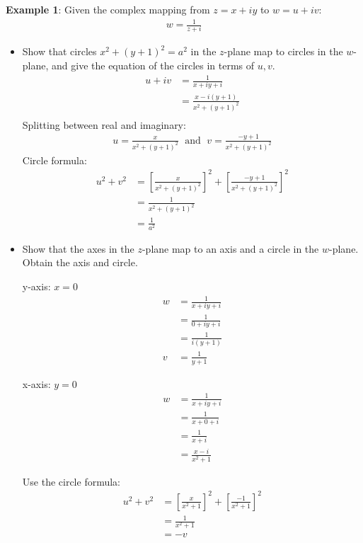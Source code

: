 \documentclass[10pt,a4paper]{article}
\begin{document}
\textbf{Example 1}: Given the complex mapping from $z=x+iy$ to $w=u+iv$:
\begin{align*}
    w = \frac{1}{z + i}
\end{align*}
\begin{itemize}
    \item Show that circles $x^2+(y+1)^2=a^2$ in the $z$-plane map to circles in the $w$-plane, and
    give the equation of the circles in terms of $u,v$.
    \begin{align*}
        u + iv &= \frac{1}{x + iy + i} \\
        &= \frac{x - i(y+1)}{x^2 + (y+1)^2} \\
    \end{align*}
    Splitting between real and imaginary: 
    \begin{align*}
        u = \frac{x}{x^2 + (y+1)^2} \; \text{ and } \; v = \frac{-y+1}{x^2 + (y+1)^2}
    \end{align*}
    Circle formula:
    \begin{align*}
        u^2+v^2 &= \left[\frac{x}{x^2 + (y+1)^2}\right]^2 + \left[\frac{-y+1}{x^2 + (y+1)^2}\right]^2 \\
        &= \frac{1}{x^2 + (y+1)^2} \\
        &= \frac{1}{a^2}
    \end{align*}

    \item Show that the axes in the $z$-plane map to an axis and a circle in the $w$-plane. Obtain the axis and circle.
    
    y-axis: $x=0$
    \begin{align*}
        w &= \frac{1}{x+iy+i} \\
        &= \frac{1}{0 + iy + i} \\
        &= \frac{1}{i(y+1)} \\
        v &= \frac{1}{y+1}
    \end{align*}

    x-axis: $y=0$
    \begin{align*}
        w &= \frac{1}{x+iy+i} \\
        &= \frac{1}{x + 0 + i} \\
        &= \frac{1}{x+i} \\
        &= \frac{x-i}{x^2+1}
    \end{align*}

    Use the circle formula:
    \begin{align*}
        u^2 + v^2 &= \left[\frac{x}{x^2 + 1}\right]^2 + \left[\frac{-1}{x^2 + 1}\right]^2 \\
        &= \frac{1}{x^2 + 1} \\
        &= -v 
    \end{align*}


\end{itemize}
\end{document}
